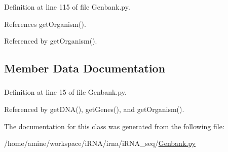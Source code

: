 \-Definition at line 115 of file \-Genbank.\-py.



\-References get\-Organism().



\-Referenced by get\-Organism().



\subsection{\-Member \-Data \-Documentation}
\hypertarget{classirna_1_1iRNA__seq_1_1Genbank_1_1Genbank_a7fce93353b62066f1eefcc777450547d}{
\subsubsection[{genbank\-String}]{}}
\label{classirna_1_1iRNA__seq_1_1Genbank_1_1Genbank_a7fce93353b62066f1eefcc777450547d}


\-Definition at line 15 of file \-Genbank.\-py.



\-Referenced by get\-D\-N\-A(), get\-Genes(), and get\-Organism().



\-The documentation for this class was generated from the following file\-:\begin{DoxyCompactItemize}
\item 
/home/amine/workspace/i\-R\-N\-A/irna/i\-R\-N\-A\-\_\-seq/\hyperlink{Genbank_8py}{\-Genbank.\-py}\end{DoxyCompactItemize}
